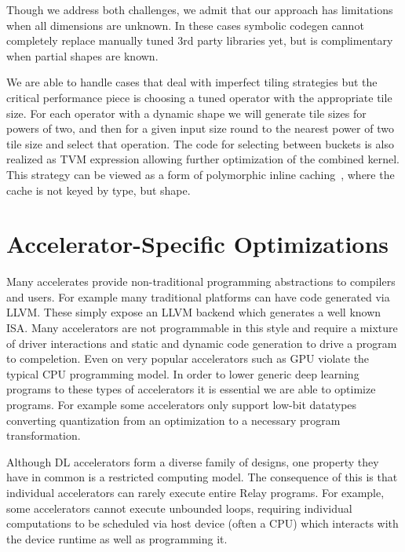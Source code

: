 Though we address both challenges, we admit that our approach has limitations when all dimensions are unknown.
In these cases symbolic codegen cannot completely replace manually tuned 3rd party libraries yet,
  but is complimentary when partial shapes are known.

We are able to handle cases that deal with imperfect tiling strategies but the critical performance piece
  is choosing a tuned operator with the appropriate tile size.
For each operator with a dynamic shape we will generate tile sizes for powers of two,
  and then for a given input size round to the nearest power of two tile size and select that operation.
The code for selecting between buckets is also realized as TVM expression allowing further optimization of the combined kernel.
This strategy can be viewed as a form of polymorphic inline caching~\citep{inline_caches},
  where the cache is not keyed by type, but shape.

\section{Accelerator-Specific Optimizations}
\label{sec:accel-opts}

Many accelerates provide non-traditional programming
    abstractions to compilers and users.
For example many traditional platforms can have
    code generated via LLVM.
These simply expose an LLVM backend which generates
    a well known ISA.
Many accelerators are not programmable in this style
    and require a mixture of driver interactions
    and static and dynamic code generation to
    drive a program to compeletion.
Even on very popular accelerators such as GPU
    violate the typical CPU programming model.
In order to lower generic deep learning programs
    to these types of accelerators it is
    essential we are able to optimize programs.
For example some accelerators only support
    low-bit datatypes converting quantization
    from an optimization to a necessary program
    transformation.

Although DL accelerators form a diverse family of designs,
  one property they have in common is a restricted computing model.
The consequence of this is that individual accelerators
  can rarely execute entire Relay programs.
For example, some accelerators cannot execute unbounded loops,
  requiring individual computations to be scheduled via
  host device (often a CPU) which interacts with the device runtime
  as well as programming it.

